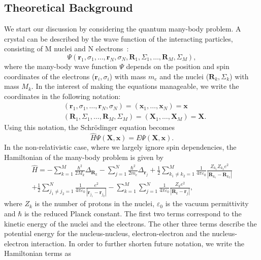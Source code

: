 \begin{refsection}
\newpage

\section{Theoretical Background} \label{dft:sec-theory}

We start our discussion by considering the quantum many-body problem. A crystal can be described by the wave function of the interacting particles, consisting of M nuclei and N electrons~\cite{Springborg2017}:
\begin{equation}
 \Psi (\mathbf{r}_1, \sigma_1, \hdots,\mathbf{r}_N, \sigma_N, \mathbf{R}_1, \Sigma_1, \hdots, \mathbf{R}_M, \Sigma_M),
\end{equation}
where the many-body wave function $\Psi$ depends on the position and spin coordinates of the electrons ($\mathbf{r}_i,\sigma_i$) with mass $m_e$ and the nuclei ($\mathbf{R}_k,\Sigma_k$) with mass $M_k$. In the interest of making the equations manageable, we write the coordinates in the following notation:
\begin{eqnarray*}
&(\mathbf{r}_1, \sigma_1, \hdots,\mathbf{r}_N, \sigma_N) = (\mathbf{x}_1,\hdots , \mathbf{x}_N) = \mathbf{x}
\\&(\mathbf{R}_1, \Sigma_1, \hdots, \mathbf{R}_M, \Sigma_M) = (\mathbf{X}_1,\hdots , \mathbf{X}_M) = \mathbf{X}.
\end{eqnarray*}
Using this notation, the Schr\"odinger equation becomes
\begin{equation}
\hat{H} \Psi (\mathbf{X}, \mathbf{x}) = E \Psi (\mathbf{X}, \mathbf{x}).
\end{equation}
In the non-relativistic case, where we largely ignore spin dependencies, the Hamiltonian of the many-body problem is given by
\begin{equation}
\begin{gathered}
\hat{H}=-\sum_{k=1}^M \frac{\hbar^2}{2M_k}\Delta_{\mathbf{R}_k}-\sum_{j=1}^N \frac{\hbar^2}{2m_e} \Delta_{\mathbf{r}_j} + \frac{1}{2} \sum_{k_1 \neq k_2 = 1}^M \frac{1}{4 \pi \varepsilon_0} \frac{Z_{k_1} Z_{k_2} e^2 }{|\mathbf{R}_{k_1}-\mathbf{R}_{k_2}|} \\ + \frac{1}{2} \sum_{j_1 \neq j_2 = 1}^N \frac{1}{4 \pi \varepsilon_0} \frac{e^2 }{|\mathbf{r}_{j_1}-\mathbf{r}_{j_2}|} - \sum_{k=1}^M \sum_{j=1}^N  \frac{1}{4 \pi \varepsilon_0} \frac{Z_k e^2 }{|\mathbf{R}_{k}-\mathbf{r}_{j}|},
\end{gathered}
\end{equation}
where $Z_k$ is the number of protons in the nuclei, $\varepsilon_0$ is the vacuum permittivity and $\hbar$ is the reduced Planck constant. The first two terms correspond to the kinetic energy of the nuclei and the electrons. The other three terms describe the potential energy for the nucleus-nucleus, electron-electron and the nucleus-electron interaction. In order to further shorten future notation, we write the Hamiltonian terms as

\end{refsection}
